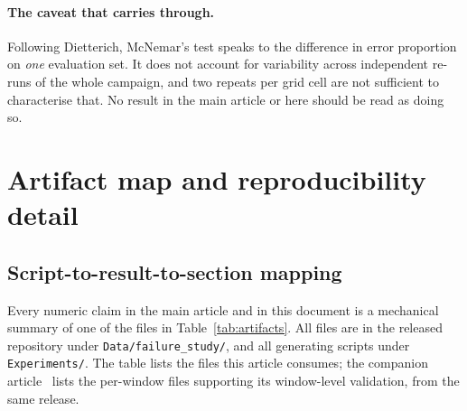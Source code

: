 \documentclass[preprint,11pt]{elsarticle}
\begin{document}
\paragraph{The caveat that carries through.} Following Dietterich,
McNemar's test speaks to the difference in error proportion on \emph{one}
evaluation set. It does not account for variability across independent
re-runs of the whole campaign, and two repeats per grid cell are not
sufficient to characterise that. No result in the main article or here
should be read as doing so.


\section{Artifact map and reproducibility detail}
\label{si:artifacts}

\subsection{Script-to-result-to-section mapping}

Every numeric claim in the main article and in this document is a
mechanical summary of one of the files in Table~\ref{tab:artifacts}. All
files are in the released repository under
\texttt{Data/failure\_study/}, and all generating scripts under
\texttt{Experiments/}. The table lists the files this article consumes;
the companion article~\cite{methodpaper} lists the per-window files
supporting its window-level validation, from the same release.
\end{document}
